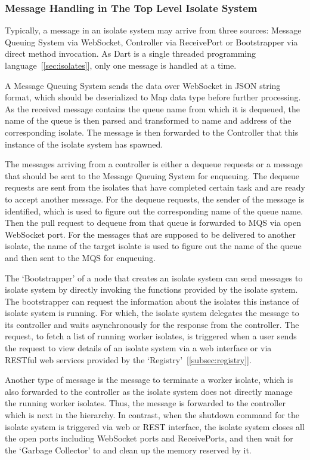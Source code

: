   \subsubsection{Message Handling in The Top Level Isolate System}
  Typically, a message in an isolate system may arrive from three sources: Message Queuing System via WebSocket, Controller via ReceivePort or Bootstrapper via direct method invocation. As Dart is a single threaded programming language~[\autoref{sec:isolates}], only one message is handled at a time.

  A Message Queuing System sends the data over WebSocket in JSON string format, which should be deserialized to Map data type before further processing. As the received message contains the queue name from which it is dequeued, the name of the queue is then parsed and transformed to name and address of the corresponding isolate. The message is then forwarded to the Controller that this instance of the isolate system has spawned.

  The messages arriving from a controller is either a dequeue requests or a message that should be sent to the Message Queuing System for enqueuing. The dequeue requests are sent from the isolates that have completed certain task and are ready to accept another message. For the dequeue requests, the sender of the message is identified, which is used to figure out the corresponding name of the queue name. Then the pull request to dequeue from that queue is forwarded to MQS via open WebSocket port. For the messages that are supposed to be delivered to another isolate, the name of the target isolate is used to figure out the name of the queue and then sent to the MQS for enqueuing.

  The ‘Bootstrapper’ of a node that creates an isolate system can send messages to isolate system by directly invoking the functions provided by the isolate system. The bootstrapper can request the information about the isolates this instance of isolate system is running. For which, the isolate system delegates the message to its controller and waits asynchronously for the response from the controller. The request, to fetch a list of running worker isolates, is triggered when a user sends the request to view details of an isolate system via a web interface or via RESTful web services provided by the ‘Registry’~[\autoref{subsec:registry}].

  Another type of message is the message to terminate a worker isolate, which is also forwarded to the controller as the isolate system does not directly manage the running worker isolates. Thus, the message is forwarded to the controller which is next in the hierarchy. In contrast, when the shutdown command for the isolate system is triggered via web or REST interface, the isolate system closes all the open ports including WebSocket ports and ReceivePorts, and then wait for the ‘Garbage Collector’ to and clean up the memory reserved by it.

